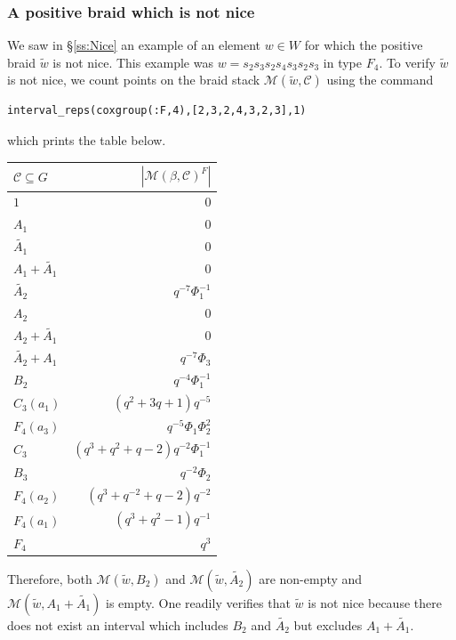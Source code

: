 \documentclass[11pt]{amsart}
\theoremstyle{definition}
\newcommand{\cC}{\mathcal{C}}
\newcommand{\cM}{\mathcal{M}}
\begin{document}
\subsubsection{A positive braid which is not nice}
We saw in \S\ref{ss:Nice} an example of an element $w\in W$ for which the positive braid $\widetilde{w}$ is not nice. This example was $w = s_2s_3s_2s_4s_3s_2s_3$ in type $F_4$. To verify $\widetilde{w}$ is not nice, we count points on the braid stack $\cM(\widetilde{w},\cC)$ using the command
\begin{center}
\begin{verbatim}
interval_reps(coxgroup(:F,4),[2,3,2,4,3,2,3],1)
\end{verbatim}
\end{center}
which prints the table below.
\begin{table}[h]
\begin{tabular}{|l|r|}
\hline
$\cC \subseteq G$ & $|\mathcal{M}(\beta,\cC)^F|$ \\
\hline
$1$ 						& $0$\\
$A_1$ 						& $0$\\
$\widetilde{A_1}$ 			& $0$\\
$A_1+\widetilde{A_1}$ 	& $0$\\
$\widetilde{A_2}$ 			& $q^{-7}\Phi_1^{-1}$\\
$A_2$ 						& $0$\\
$A_2+\widetilde{A_1}$ 	& $0$\\
$\widetilde{A_2}+A_1$ 	& $q^{-7}\Phi_3$\\
$B_2$ 						& $q^{-4}\Phi_1^{-1}$\\
$C_3(a_1)$ 				& $(q^2+3q+1)q^{-5}$\\
$F_4(a_3)$ 				& $q^{-5}\Phi_1\Phi_2^2$\\
$C_3$ 						& $(q^3+q^2+q-2)q^{-2}\Phi_1^{-1}$\\
$B_3$ 						& $q^{-2}\Phi_2$\\
$F_4(a_2)$ 				& $(q^3+q^{-2}+q-2)q^{-2}$\\
$F_4(a_1)$ 				& $(q^3+q^2-1)q^{-1}$\\
$F_4$ 						& $q^3$\\
\hline
\end{tabular}
\end{table}

Therefore, both $\cM(\widetilde{w},B_2)$ and $\cM(\widetilde{w},\widetilde{A_2})$ are non-empty and $\cM(\widetilde{w},A_1+\widetilde{A_1})$ is empty. One readily verifies that $\widetilde{w}$ is not nice because there does not exist an interval which includes $B_2$ and $\widetilde{A_2}$ but excludes $A_1+\widetilde{A_1}$. 

\vfill
\end{document}
